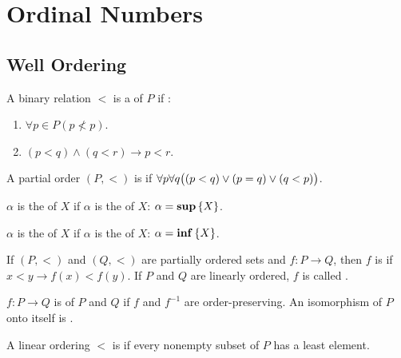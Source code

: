 \section{Ordinal Numbers}

\subsection{Well Ordering}
\begin{definition}
    A binary relation $<$ is a  of $P$ if :
    \begin{enumerate}
        \item $\forall p \in P (p \nless p)$.
        \item $(p < q) \wedge (q < r) \rightarrow p < r$.
    \end{enumerate}
\end{definition}

\begin{definition}
    A partial order $(P, <)$ is  if $\forall p \forall q \mleft( (p < q)   \vee (p = q) \vee (q < p) \mright)$.
\end{definition}


\begin{definition}
    $\alpha$ is the  of $X$ if $\alpha$ is the  of $X$: $\alpha = \mathbf{sup} \set{X}$.
\end{definition}

\begin{definition}
    $\alpha$ is the  of $X$ if $\alpha$ is the  of $X$: $\alpha = \mathbf{inf} \set{X}$.
\end{definition}


\begin{definition}
    If $(P, <)$ and $(Q,<)$ are partially ordered sets and $f: P \rightarrow Q$, then $f$ is  if $x < y \rightarrow f(x) < f(y)$. If $P$ and $Q$ are linearly ordered, $f$ is called .
\end{definition}

\begin{definition}
    $f: P \rightarrow Q$  is  of $P$ and $Q$ if $f$ and $f^{-1}$ are order-preserving. An isomorphism of $P$ onto itself is .
\end{definition}


\begin{definition}
    A linear ordering $<$ is  if every nonempty subset of $P$ has a least element.
\end{definition}

